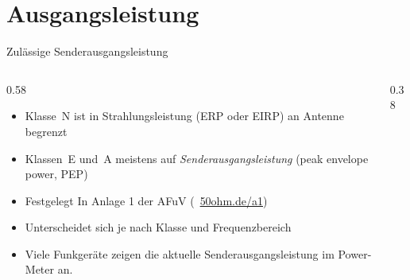\section{Ausgangsleistung}
\label{section:ausgangsleistung}
\begin{frame}{Zulässige Senderausgangsleistung}
    \begin{columns}
        \begin{column}{0.58\linewidth}
            \begin{itemize}
                \item Klasse~N ist in Strahlungsleistung (ERP oder EIRP) an Antenne begrenzt
                \item Klassen~E und~A meistens auf \emph{Senderausgangsleistung} (peak envelope power, PEP)
                \item Festgelegt In Anlage 1 der AFuV (\textcolor{DARCblue}{\faLink~\href{https://50ohm.de/a1}{50ohm.de/a1}}) 
                \item Unterscheidet sich je nach Klasse und Frequenzbereich
                \item Viele Funkgeräte zeigen die aktuelle Senderausgangsleistung im Power-Meter an.
            \end{itemize}
        \end{column}
        \begin{column}{0.38\linewidth}
        \end{column}
    \end{columns}
\end{frame}

\begin{frame}
\end{frame}


